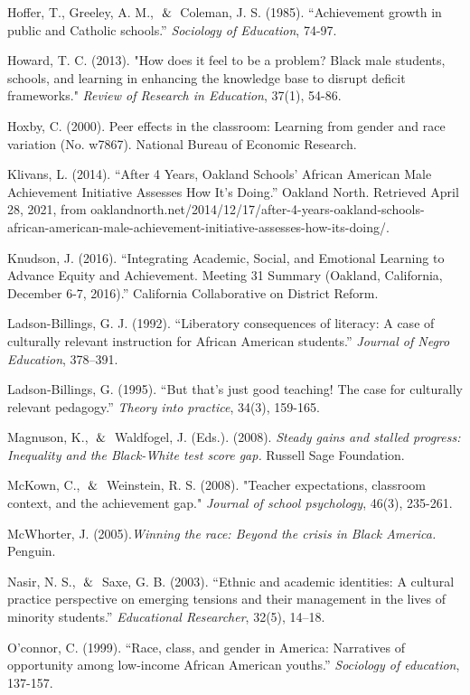 \begin{hangparas}{.25in}{1}
Hoffer, T., Greeley, A. M., $\And$ Coleman, J. S. (1985). “Achievement growth in public and Catholic schools.” \textit{Sociology of Education}, 74-97.

Howard, T. C. (2013). "How does it feel to be a problem? Black male students, schools, and learning in enhancing the knowledge base to disrupt deficit frameworks." \textit{Review of Research in Education}, 37(1), 54-86.

Hoxby, C. (2000). Peer effects in the classroom: Learning from gender and race variation (No. w7867). National Bureau of Economic Research.

Klivans, L. (2014). “After 4 Years, Oakland Schools' African American Male Achievement Initiative Assesses How It's Doing.” Oakland North. Retrieved April 28, 2021, from oaklandnorth.net/2014/12/17/after-4-years-oakland-schools-african-american-male-achievement-initiative-assesses-how-its-doing/. 

Knudson, J. (2016). “Integrating Academic, Social, and Emotional Learning to Advance Equity and Achievement. Meeting 31 Summary (Oakland, California, December 6-7, 2016).” California Collaborative on District Reform.

Ladson-Billings, G. J. (1992). “Liberatory consequences of literacy: A case of culturally relevant instruction for African American students.” \textit{Journal of Negro Education}, 378–391.

Ladson‐Billings, G. (1995). “But that's just good teaching! The case for culturally relevant pedagogy.” \textit{Theory into practice}, 34(3), 159-165.

Magnuson, K., $\And$ Waldfogel, J. (Eds.). (2008). \textit{Steady gains and stalled progress: Inequality and the Black-White test score gap.} Russell Sage Foundation.

McKown, C., $\And$ Weinstein, R. S. (2008). "Teacher expectations, classroom context, and the achievement gap." \textit{Journal of school psychology}, 46(3), 235-261.

McWhorter, J. (2005).\textit{Winning the race: Beyond the crisis in Black America.}  Penguin.

Nasir, N. S., $\And$ Saxe, G. B. (2003). “Ethnic and academic identities: A cultural practice perspective on emerging tensions and their management in the lives of minority students.” \textit{Educational Researcher}, 32(5), 14–18.

O'connor, C. (1999). “Race, class, and gender in America: Narratives of opportunity among low-income African American youths.” \textit{Sociology of education}, 137-157.


\end{hangparas}
